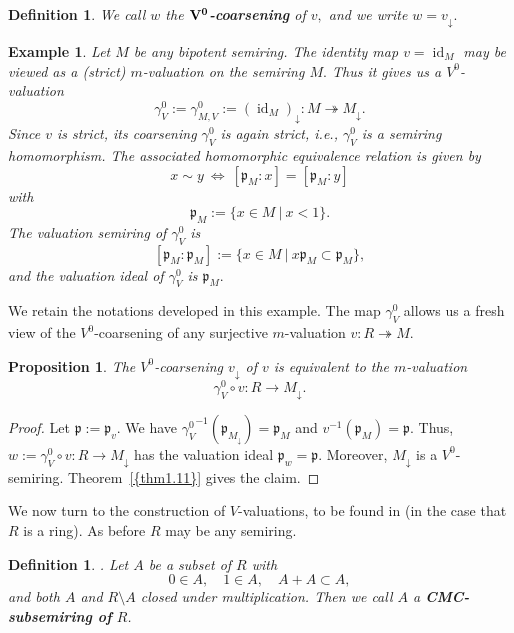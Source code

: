 \documentclass [12pt,a4paper,reqno]{amsart}
\newtheorem{prop}[thm]{Proposition}
\newtheorem{example}[thm]{Example}
\newtheorem{defn}[thm]{Definition}
\begin{document}
\begin{defn}\label{defn1.13} We call $w$ the
{\textbf{{$\bf {V^0}$-coarsening}}} of $v,$ and we write $w={v_{\downarrow}}.$
\end{defn}

\begin{example}\label{examp1.14}
Let $M$ be any bipotent semiring. The identity map $v={\operatorname{id}}_M$ may
be viewed as a (strict) $m$-valuation on the semiring $M.$ Thus it
gives us a ${V^0}$-valuation $${\gamma}_V^0 := {\gamma}^0_{M,V} :=
({\operatorname{id}}_M)_\downarrow: M\twoheadrightarrow {M_{\downarrow}}.$$ Since $v$ is
strict, its coarsening ${\gamma}_V^0$ is again strict, i.e., ${\gamma}_V^0$
is a semiring homomorphism. The associated homomorphic equivalence
relation is given by
$$x\sim y{\ {\Leftrightarrow} \ } [{\mathfrak p} _M:x]=[{\mathfrak p} _M:y]$$
with $${\mathfrak p} _M:=\{x\in M {\ {|} \ }x<1\}.$$ The valuation semiring of
${\gamma}_V^0$ is
$$[ {\mathfrak p}_M: {\mathfrak p}_M ] :=\{x\in M{\ {|} \ }x {\mathfrak p}_M \subset   {\mathfrak p}_M\},$$ and the valuation ideal of ${\gamma}_V^0$ is
${\mathfrak p} _M.$\end{example}

We retain the notations developed in this example. The map
${\gamma}_V^0$ allows us a fresh view of the ${V^0}$-coarsening of any
surjective $m$-valuation $v: R \twoheadrightarrow M.$

\begin{prop}\label{prop1.15}
The ${V^0}$-coarsening ${v_{\downarrow}}$ of $v$ is equivalent to the
$m$-valuation
$${\gamma}_V^0\circ v: R\to{M_{\downarrow}}.$$
\end{prop}

\begin{proof} Let ${\mathfrak p} :={\mathfrak p} _v.$ We have
${{\gamma}_V^0}^{-1}({\mathfrak p} _{M_{\downarrow}})={\mathfrak p} _M$ and $v^{-1}({\mathfrak p}_M)={\mathfrak p}
.$ Thus, $w:={\gamma}_V^0\circ v: R\to {M_{\downarrow}}$ has the valuation ideal
${\mathfrak p} _w={\mathfrak p} .$ Moreover, ${M_{\downarrow}}$ is a ${V^0}$-semiring.
{Theorem~\ref{{thm1.11}}} gives the claim.\end{proof}

We now turn to the construction of $V$-valuations, to be found in
\cite{HV1} (in the  case that $R$ is a ring). As before $R$ may be
any semiring.

\begin{defn}\label{defn1.16} \cite{HV1}. Let $A$ be a subset of $R$
with $$ 0 \in A, \quad 1 \in A, \quad A+A \subset A,$$ and both
$A$ and $R \setminus A$   closed under multiplication.  Then we
call $A$ a \textbf{CMC-subsemiring of} $R$.
\end{defn}
\end{document}
